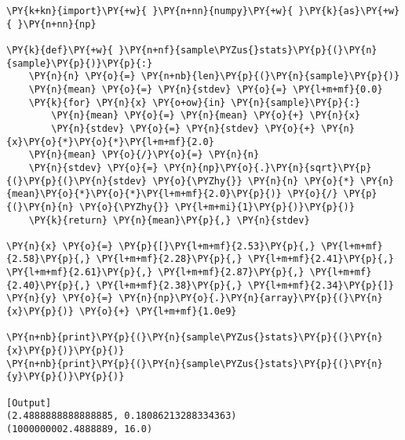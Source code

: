 \begin{Verbatim}[label=\makebox{\href{https://github.com/unipi-physics-labs/statnotes/tree/main/snippy/sample_stat_single.py}{https://github.com/.../sample\_stat\_single.py}},commandchars=\\\{\}]
\PY{k+kn}{import}\PY{+w}{ }\PY{n+nn}{numpy}\PY{+w}{ }\PY{k}{as}\PY{+w}{ }\PY{n+nn}{np}

\PY{k}{def}\PY{+w}{ }\PY{n+nf}{sample\PYZus{}stats}\PY{p}{(}\PY{n}{sample}\PY{p}{)}\PY{p}{:}
    \PY{n}{n} \PY{o}{=} \PY{n+nb}{len}\PY{p}{(}\PY{n}{sample}\PY{p}{)}
    \PY{n}{mean} \PY{o}{=} \PY{n}{stdev} \PY{o}{=} \PY{l+m+mf}{0.0}
    \PY{k}{for} \PY{n}{x} \PY{o+ow}{in} \PY{n}{sample}\PY{p}{:}
        \PY{n}{mean} \PY{o}{=} \PY{n}{mean} \PY{o}{+} \PY{n}{x}
        \PY{n}{stdev} \PY{o}{=} \PY{n}{stdev} \PY{o}{+} \PY{n}{x}\PY{o}{*}\PY{o}{*}\PY{l+m+mf}{2.0}
    \PY{n}{mean} \PY{o}{/}\PY{o}{=} \PY{n}{n}
    \PY{n}{stdev} \PY{o}{=} \PY{n}{np}\PY{o}{.}\PY{n}{sqrt}\PY{p}{(}\PY{p}{(}\PY{n}{stdev} \PY{o}{\PYZhy{}} \PY{n}{n} \PY{o}{*} \PY{n}{mean}\PY{o}{*}\PY{o}{*}\PY{l+m+mf}{2.0}\PY{p}{)} \PY{o}{/} \PY{p}{(}\PY{n}{n} \PY{o}{\PYZhy{}} \PY{l+m+mi}{1}\PY{p}{)}\PY{p}{)}
    \PY{k}{return} \PY{n}{mean}\PY{p}{,} \PY{n}{stdev}

\PY{n}{x} \PY{o}{=} \PY{p}{[}\PY{l+m+mf}{2.53}\PY{p}{,} \PY{l+m+mf}{2.58}\PY{p}{,} \PY{l+m+mf}{2.28}\PY{p}{,} \PY{l+m+mf}{2.41}\PY{p}{,} \PY{l+m+mf}{2.61}\PY{p}{,} \PY{l+m+mf}{2.87}\PY{p}{,} \PY{l+m+mf}{2.40}\PY{p}{,} \PY{l+m+mf}{2.38}\PY{p}{,} \PY{l+m+mf}{2.34}\PY{p}{]}
\PY{n}{y} \PY{o}{=} \PY{n}{np}\PY{o}{.}\PY{n}{array}\PY{p}{(}\PY{n}{x}\PY{p}{)} \PY{o}{+} \PY{l+m+mf}{1.0e9}

\PY{n+nb}{print}\PY{p}{(}\PY{n}{sample\PYZus{}stats}\PY{p}{(}\PY{n}{x}\PY{p}{)}\PY{p}{)}
\PY{n+nb}{print}\PY{p}{(}\PY{n}{sample\PYZus{}stats}\PY{p}{(}\PY{n}{y}\PY{p}{)}\PY{p}{)}

[Output]
(2.4888888888888885, 0.18086213288334363)
(1000000002.4888889, 16.0)
\end{Verbatim}
